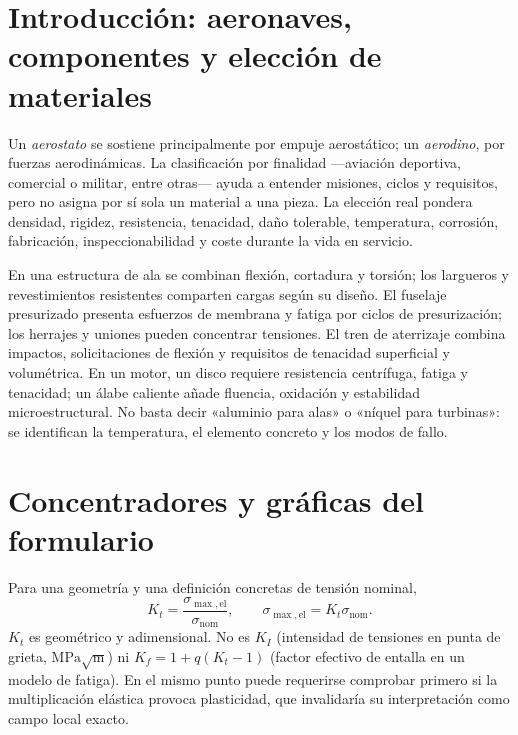 \section{Introducción: aeronaves, componentes y elección de materiales}
Un \emph{aerostato} se sostiene principalmente por empuje aerostático; un \emph{aerodino}, por fuerzas aerodinámicas. La clasificación por finalidad ---aviación deportiva, comercial o militar, entre otras--- ayuda a entender misiones, ciclos y requisitos, pero no asigna por sí sola un material a una pieza. La elección real pondera densidad, rigidez, resistencia, tenacidad, daño tolerable, temperatura, corrosión, fabricación, inspeccionabilidad y coste durante la vida en servicio.

En una estructura de ala se combinan flexión, cortadura y torsión; los largueros y revestimientos resistentes comparten cargas según su diseño. El fuselaje presurizado presenta esfuerzos de membrana y fatiga por ciclos de presurización; los herrajes y uniones pueden concentrar tensiones. El tren de aterrizaje combina impactos, solicitaciones de flexión y requisitos de tenacidad superficial y volumétrica. En un motor, un disco requiere resistencia centrífuga, fatiga y tenacidad; un álabe caliente añade fluencia, oxidación y estabilidad microestructural. No basta decir «aluminio para alas» o «níquel para turbinas»: se identifican la temperatura, el elemento concreto y los modos de fallo.


\section{Concentradores y gráficas del formulario}
Para una geometría y una definición concretas de tensión nominal,
\[
K_t=\frac{\sigma_{\max,\mathrm{el}}}{\sigma_{\mathrm{nom}}},\qquad
\sigma_{\max,\mathrm{el}}=K_t\sigma_{\mathrm{nom}}.
\]
$K_t$ es geométrico y adimensional. No es $K_I$ (intensidad de tensiones en punta de grieta, $\mathrm{MPa}\sqrt{\mathrm m}$) ni $K_f=1+q(K_t-1)$ (factor efectivo de entalla en un modelo de fatiga). En el mismo punto puede requerirse comprobar primero si la multiplicación elástica provoca plasticidad, que invalidaría su interpretación como campo local exacto.


